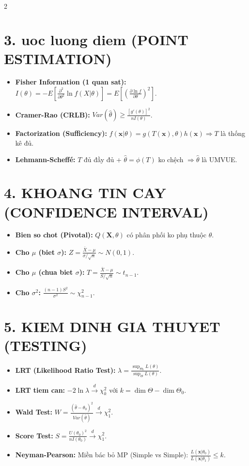 \documentclass[8pt,a4paper]{article}
\begin{document}
\begin{multicols*}{2}
\section{3. uoc luong diem (POINT ESTIMATION)}
\begin{itemize}
    \item \textbf{Fisher Information (1 quan sat):} $I(\theta) = -E[\frac{\partial^2}{\partial \theta^2} \ln f(X|\theta)] = E[(\frac{\partial \ln f}{\partial \theta})^2]$.
    \item \textbf{Cramer-Rao (CRLB):} $Var(\hat{\theta}) \geq \frac{[g'(\theta)]^2}{n I(\theta)}$.
    \item \textbf{Factorization (Sufficiency):} $f(\mathbf{x}|\theta) = g(T(\mathbf{x}), \theta)h(\mathbf{x}) \Rightarrow T$ là thống kê đủ.
    \item \textbf{Lehmann-Scheffé:} $T$ đủ đầy đủ + $\hat{\theta} = \phi(T)$ ko chệch $\Rightarrow \hat{\theta}$ là UMVUE.
\end{itemize}

\section{4. KHOANG TIN CAY (CONFIDENCE INTERVAL)}
\begin{itemize}
    \item \textbf{Bien so chot (Pivotal):} $Q(\mathbf{X}, \theta)$ có phân phối ko phụ thuộc $\theta$.
    \item \textbf{Cho $\mu$ (biet $\sigma$):} $Z = \frac{\bar{X}-\mu}{\sigma/\sqrt{n}} \sim N(0,1)$.
    \item \textbf{Cho $\mu$ (chua biet $\sigma$):} $T = \frac{\bar{X}-\mu}{S/\sqrt{n}} \sim t_{n-1}$.
    \item \textbf{Cho $\sigma^2$:} $\frac{(n-1)S^2}{\sigma^2} \sim \chi^2_{n-1}$.
\end{itemize}

\columnbreak

\section{5. KIEM DINH GIA THUYET (TESTING)}
\begin{itemize}
    \item \textbf{LRT (Likelihood Ratio Test):} $\lambda = \frac{\sup_{\Theta_0} L(\theta)}{\sup_{\Theta} L(\theta)}$.
    \item \textbf{LRT tiem can:} $-2\ln \lambda \xrightarrow{d} \chi^2_k$ với $k = \dim \Theta - \dim \Theta_0$.
    \item \textbf{Wald Test:} $W = \frac{(\hat{\theta} - \theta_0)^2}{Var(\hat{\theta})} \xrightarrow{d} \chi^2_1$.
    \item \textbf{Score Test:} $S = \frac{U(\theta_0)^2}{n I(\theta_0)} \xrightarrow{d} \chi^2_1$.
    \item \textbf{Neyman-Pearson:} Miền bác bỏ MP (Simple vs Simple): $\frac{L(\mathbf{x}|\theta_0)}{L(\mathbf{x}|\theta_1)} \leq k$.
\end{itemize}


\end{multicols*}
\end{document}
